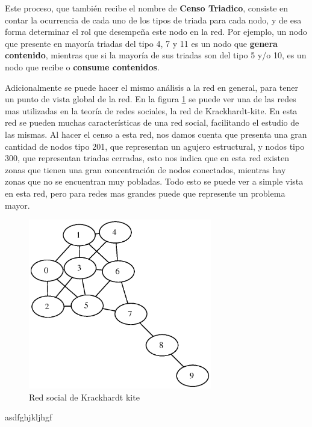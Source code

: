 Este proceso, que también recibe el nombre de \textbf{Censo Triadico}, consiste en contar la ocurrencia de cada uno de los tipos de triada para cada nodo, y de esa forma determinar el rol que desempeña este nodo en la red. Por ejemplo, un nodo que presente en mayoría triadas del tipo 4, 7 y 11 es un nodo que \textbf{genera contenido}, mientras que si la mayoría de sus triadas son del tipo 5 y/o 10, es un nodo que recibe o \textbf{consume contenidos}.

Adicionalmente se puede hacer el mismo análisis a la red en general, para tener un punto de vista global de la red. En la figura \ref{fig:red_krackhardt} se puede ver una de las redes mas utilizadas en la teoría de redes sociales, la red de Krackhardt-kite. En esta red se pueden muchas características de una red social, facilitando el estudio de las mismas. Al hacer el censo a esta red, nos damos cuenta que presenta una gran cantidad de nodos tipo 201, que representan un agujero estructural, y nodos tipo 300, que representan triadas cerradas, esto nos indica que en esta red existen zonas que tienen una gran concentración de nodos conectados, mientras hay zonas que no se encuentran muy pobladas. Todo esto se puede ver a simple vista en esta red, pero para redes mas grandes puede que represente un problema mayor.

\begin{figure}[!htb]
  \begin{center}
    \includegraphics[width=8cm]{./imagenes/red_krackhardt_kite.eps}
    \caption{Red social de Krackhardt kite}
    \label{fig:red_krackhardt}
  \end{center}
\end{figure}

asdfghjkljhgf
